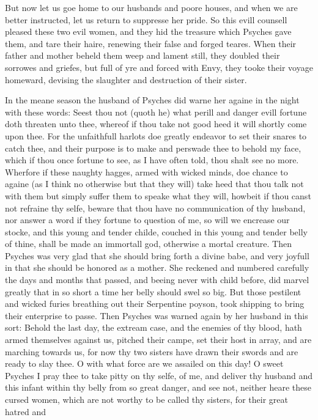 But now let us goe home to our husbands and poore houses, and when we are
better instructed, let us return to suppresse her pride. So this evill counsell
pleased these two evil women, and they hid the treasure which Psyches gave
them, and tare their haire, renewing their false and forged teares. When their
father and mother beheld them weep and lament still, they doubled their
sorrowes and griefes, but full of yre and forced with Envy, they tooke their
voyage homeward, devising the slaughter and destruction of their sister.

In the meane season the husband of Psyches did warne her againe in the night
with these words: Seest thou not (quoth he) what perill and danger evill
fortune doth threaten unto thee, whereof if thou take not good heed it will
shortly come upon thee. For the unfaithfull harlots doe greatly endeavor to set
their snares to catch thee, and their purpose is to make and perswade thee to
behold my face, which if thou once fortune to see, as I have often told, thou
shalt see no more. Wherfore if these naughty hagges, armed with wicked minds,
doe chance to againe (as I think no otherwise but that they will) take heed
that thou talk not with them but simply suffer them to speake what they will,
howbeit if thou canst not refraine thy selfe, beware that thou have no
communication of thy husband, nor answer a word if they fortune to question of
me, so will we encrease our stocke, and this young and tender childe, couched
in this young and tender belly of thine, shall be made an immortall god,
otherwise a mortal creature. Then Psyches was very glad that she should bring
forth a divine babe, and very joyfull in that she should be honored as a
mother. She reckened and numbered carefully the days and months that passed,
and beeing never with child before, did marvel greatly that in so short a time
her belly should swel so big. But those pestilent and wicked furies breathing
out their Serpentine poyson, took shipping to bring their enterprise to passe.
Then Psyches was warned again by her husband in this sort: Behold the last day,
the extream case, and the enemies of thy blood, hath armed themselves against
us, pitched their campe, set their host in array, and are marching towards us,
for now thy two sisters have drawn their swords and are ready to slay thee. O
with what force are we assailed on this day! O sweet Psyches I pray thee to
take pitty on thy selfe, of me, and deliver thy husband and this infant within
thy belly from so great danger, and see not, neither heare these cursed women,
which are not worthy to be called thy sisters, for their great hatred and
